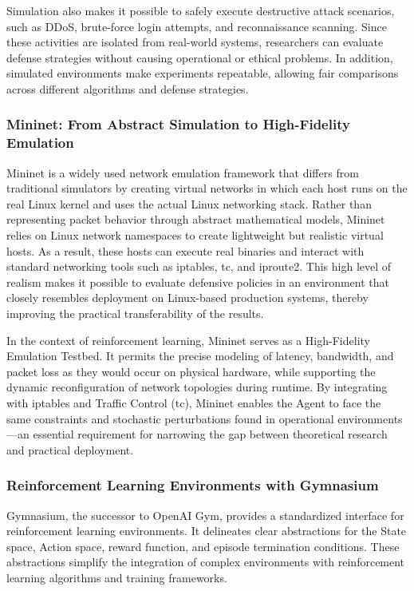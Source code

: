 \documentclass[12pt,a4paper]{report}
\begin{document}
Simulation also makes it possible to safely execute destructive attack scenarios, such as DDoS, brute-force login attempts, and reconnaissance scanning. Since these activities are isolated from real-world systems, researchers can evaluate defense strategies without causing operational or ethical problems. In addition, simulated environments make experiments repeatable, allowing fair comparisons across different algorithms and defense strategies.

\subsubsection*{Mininet: From Abstract Simulation to High-Fidelity Emulation}

Mininet is a widely used network emulation framework that differs from traditional simulators by creating virtual networks in which each host runs on the real Linux kernel and uses the actual Linux networking stack. Rather than representing packet behavior through abstract mathematical models, Mininet relies on Linux network namespaces to create lightweight but realistic virtual hosts. As a result, these hosts can execute real binaries and interact with standard networking tools such as iptables, tc, and iproute2. This high level of realism makes it possible to evaluate defensive policies in an environment that closely resembles deployment on Linux-based production systems, thereby improving the practical transferability of the results.

In the context of reinforcement learning, Mininet serves as a High-Fidelity Emulation Testbed. It permits the precise modeling of latency, bandwidth, and packet loss as they would occur on physical hardware, while supporting the dynamic reconfiguration of network topologies during runtime. By integrating with iptables and Traffic Control (tc), Mininet enables the Agent to face the same constraints and stochastic perturbations found in operational environments—an essential requirement for narrowing the gap between theoretical research and practical deployment.

\subsubsection*{Reinforcement Learning Environments with Gymnasium}

Gymnasium, the successor to OpenAI Gym, provides a standardized interface for reinforcement learning environments. It delineates clear abstractions for the State space, Action space, reward function, and episode termination conditions. These abstractions simplify the integration of complex environments with reinforcement learning algorithms and training frameworks.
\end{document}
